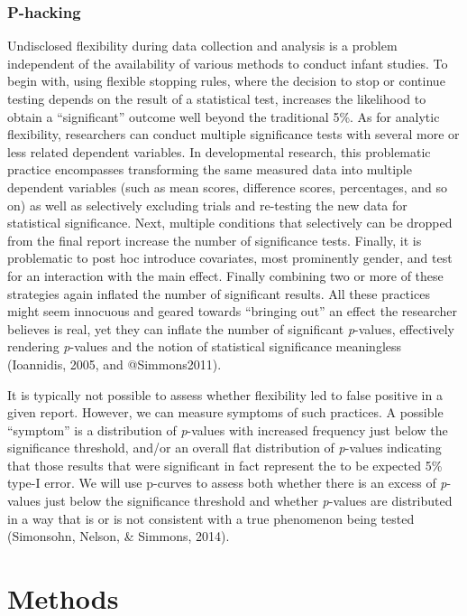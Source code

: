 \documentclass[english,floatsintext,man]{apa6}
\begin{document}
\subsubsection{P-hacking}\label{p-hacking}

Undisclosed flexibility during data collection and analysis is a problem
independent of the availability of various methods to conduct infant
studies. To begin with, using flexible stopping rules, where the
decision to stop or continue testing depends on the result of a
statistical test, increases the likelihood to obtain a
\enquote{significant} outcome well beyond the traditional 5\%. As for
analytic flexibility, researchers can conduct multiple significance
tests with several more or less related dependent variables. In
developmental research, this problematic practice encompasses
transforming the same measured data into multiple dependent variables
(such as mean scores, difference scores, percentages, and so on) as well
as selectively excluding trials and re-testing the new data for
statistical significance. Next, multiple conditions that selectively can
be dropped from the final report increase the number of significance
tests. Finally, it is problematic to post hoc introduce covariates, most
prominently gender, and test for an interaction with the main effect.
Finally combining two or more of these strategies again inflated the
number of significant results. All these practices might seem innocuous
and geared towards \enquote{bringing out} an effect the researcher
believes is real, yet they can inflate the number of significant
\emph{p}-values, effectively rendering \emph{p}-values and the notion of
statistical significance meaningless (Ioannidis, 2005, and
@Simmons2011).

It is typically not possible to assess whether flexibility led to false
positive in a given report. However, we can measure symptoms of such
practices. A possible \enquote{symptom} is a distribution of
\emph{p}-values with increased frequency just below the significance
threshold, and/or an overall flat distribution of \emph{p}-values
indicating that those results that were significant in fact represent
the to be expected 5\% type-I error. We will use p-curves to assess both
whether there is an excess of \emph{p}-values just below the
significance threshold and whether \emph{p}-values are distributed in a
way that is or is not consistent with a true phenomenon being tested
(Simonsohn, Nelson, \& Simmons, 2014).

\section{Methods}\label{methods}
\end{document}
